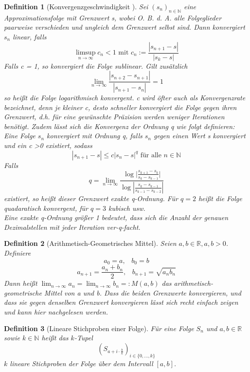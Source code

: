 \documentclass{scrartcl}
\newtheorem{definition}{Definition}
\theoremstyle{definition}
\newtheorem{approximation sequence}{Annäherungsfolge}
\begin{document}
\begin{definition}[Konvergenzgeschwindigkeit \cite{Konvergenzgeschwindigkeit}]
    Sei \((s_n)_{n \in \mathbb{N}}\) eine Approximationsfolge mit Grenzwert s, wobei O. B. d. A. alle Folgeglieder paarweise verschieden und ungleich dem Grenzwert selbst sind.
    Dann konvergiert \(s_n\) linear, falls
    \[\limsup_{n \to \infty} c_n < 1 \text{ mit } c_n := \frac{|s_{n+1}-s|}{|s_k-s|} \]
    Falls c = 1, so konvergiert die Folge sublinear.
    Gilt zusätzlich 
    \[\lim_{n \to \infty} \frac{|s_{n+2}-s_{n+1}|}{|s_{n+1}-s_n|} = 1\]
    so heißt die Folge logarithmisch konvergent.
    c wird öfter auch als Konvergenzrate bezeichnet, denn je kleiner c, desto schneller konvergiert die Folge gegen ihren Grenzwert, 
    d.h. für eine gewünschte Präzision werden weniger Iterationen benötigt.
    Zudem lässt sich die Konvergenz der Ordnung q wie folgt definieren:
    Eine Folge \(s_n\) konvergiert mit Ordnung q, falls \(s_n\) gegen einen Wert s konvergiert und ein c \textgreater 0 existiert, sodass
    \[|s_{n+1} - s| \leqslant c|s_n - s|^q \text{ für alle } n \in \mathbb{N}\]
    Falls
    \[q = \lim_{n \to \infty} \frac{\log|{\frac{s_{k+1} - s_k}{s_k - s_{k-1}}|}}{\log{|\frac{s_k - s_{k-1}}{s_{k-1} - s_{k-2}}|}} \]
    existiert, so heißt dieser Grenzwert exakte q-Ordnung.
    Für \(q = 2\) heißt die Folge quadaratisch konvergent, für \(q = 3 \) kubisch usw. \\
    Eine exakte q-Ordnung größer 1 bedeutet, dass sich die Anzahl der genauen Dezimalstellen mit jeder Iteration ver-q-facht.
\end{definition}

\begin{definition}[Arithmetisch-Geometrisches Mittel]
    Seien \(a, b \in \mathbb{R}, a,b > 0\). Definiere 
    \[a_0 = a, \;\;\; b_0 = b\]
    \[a_{n+1} = \frac{a_n + b_n}{2}, \;\;\; b_{n+1} = \sqrt{a_n b_n}\]
    Dann heißt \(\lim_{n \to \infty}a_n = \lim_{n \to \infty} b_n =: M(a,b) \) das arithmetisch-geometrische Mittel von a und b.
    Dass die beiden Grenzwerte konvergieren, und dass sie gegen denselben Grenzwert konvergieren lässt sich recht einfach zeigen und kann 
    hier \cite{AGM} nachgelesen werden.
\end{definition}

\begin{definition}[Lineare Stichproben einer Folge]
    Für eine Folge \(S_n\) und \(a, b \in \mathbb{R}\) sowie \(k \in
    \mathbb{N}\) heißt das \(k\)-Tupel
    \begin{equation}
        \left(S_{a + i \cdot \frac{b}{k}}\right)_{i \in \{0, \ldots, k\}}
    \end{equation}
    \(k\) lineare Stichproben der Folge über dem Intervall \([a, b]\).
\end{definition}
\end{document}
